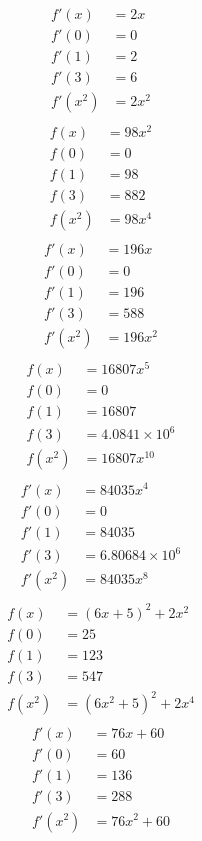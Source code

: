 \begin{align*}
f'(x) &= 2x\\
f'(0) &= 0\\ 
f'(1) &= 2\\
f'(3) &= 6\\ 
f'(x^2) &= 2{{x}^{2}}\\
\end{align*}
\begin{align*}
f(x) &= 98{{x}^{2}}\\
f(0) &= 0\\ 
f(1) &= 98\\ 
f(3) &= 882\\ 
f(x^2) &= 98{{x}^{4}}\\
\end{align*}
\begin{align*}
f'(x) &= 196x\\
f'(0) &= 0\\ 
f'(1) &= 196\\
f'(3) &= 588\\ 
f'(x^2) &= 196{{x}^{2}}\\
\end{align*}
\begin{align*}
f(x) &= 16807{{x}^{5}}\\
f(0) &= 0\\ 
f(1) &= 16807\\ 
f(3) &= 4.0841\times 10^{6}\\ 
f(x^2) &= 16807{{x}^{10}}\\
\end{align*}
\begin{align*}
f'(x) &= 84035{{x}^{4}}\\
f'(0) &= 0\\ 
f'(1) &= 84035\\
f'(3) &= 6.80684\times 10^{6}\\ 
f'(x^2) &= 84035{{x}^{8}}\\
\end{align*}
\begin{align*}
f(x) &= {{\left(6x+5\right)}^{2}}+2{{x}^{2}}\\
f(0) &= 25\\ 
f(1) &= 123\\ 
f(3) &= 547\\ 
f(x^2) &= {{\left(6{{x}^{2}}+5\right)}^{2}}+2{{x}^{4}}\\
\end{align*}
\begin{align*}
f'(x) &= 76x+60\\
f'(0) &= 60\\ 
f'(1) &= 136\\
f'(3) &= 288\\ 
f'(x^2) &= 76{{x}^{2}}+60\\
\end{align*}
